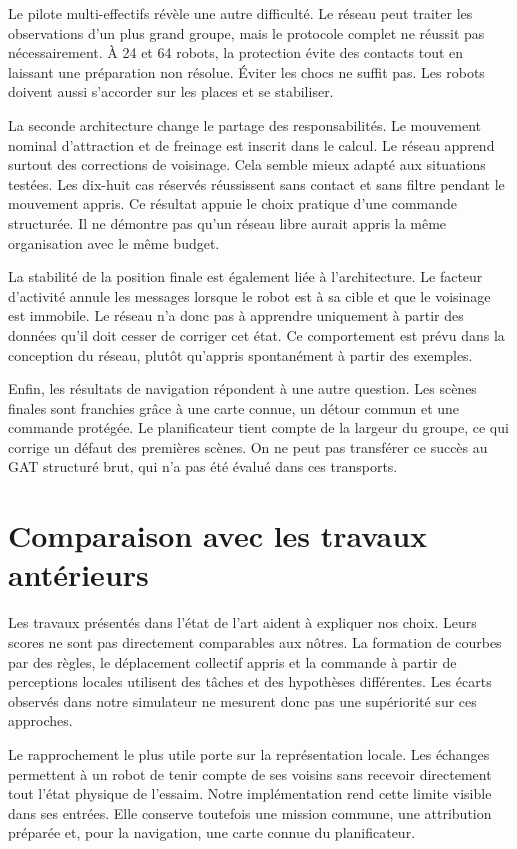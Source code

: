 Le pilote multi-effectifs révèle une autre difficulté. Le réseau peut traiter les observations d'un plus grand groupe, mais le protocole complet ne réussit pas nécessairement. À 24 et 64 robots, la protection évite des contacts tout en laissant une préparation non résolue. Éviter les chocs ne suffit pas. Les robots doivent aussi s'accorder sur les places et se stabiliser.

La seconde architecture change le partage des responsabilités. Le mouvement nominal d'attraction et de freinage est inscrit dans le calcul. Le réseau apprend surtout des corrections de voisinage. Cela semble mieux adapté aux situations testées. Les dix-huit cas réservés réussissent sans contact et sans filtre pendant le mouvement appris. Ce résultat appuie le choix pratique d'une commande structurée. Il ne démontre pas qu'un réseau libre aurait appris la même organisation avec le même budget.

La stabilité de la position finale est également liée à l'architecture. Le facteur d'activité annule les messages lorsque le robot est à sa cible et que le voisinage est immobile. Le réseau n'a donc pas à apprendre uniquement à partir des données qu'il doit cesser de corriger cet état. Ce comportement est prévu dans la conception du réseau, plutôt qu'appris spontanément à partir des exemples.

Enfin, les résultats de navigation répondent à une autre question. Les scènes finales sont franchies grâce à une carte connue, un détour commun et une commande protégée. Le planificateur tient compte de la largeur du groupe, ce qui corrige un défaut des premières scènes. On ne peut pas transférer ce succès au GAT structuré brut, qui n'a pas été évalué dans ces transports.

\section*{Comparaison avec les travaux antérieurs}
{}
Les travaux présentés dans l'état de l'art aident à expliquer nos choix. Leurs scores ne sont pas directement comparables aux nôtres. La formation de courbes par des règles, le déplacement collectif appris et la commande à partir de perceptions locales utilisent des tâches et des hypothèses différentes. Les écarts observés dans notre simulateur ne mesurent donc pas une supériorité sur ces approches.

Le rapprochement le plus utile porte sur la représentation locale. Les échanges permettent à un robot de tenir compte de ses voisins sans recevoir directement tout l'état physique de l'essaim. Notre implémentation rend cette limite visible dans ses entrées. Elle conserve toutefois une mission commune, une attribution préparée et, pour la navigation, une carte connue du planificateur.


